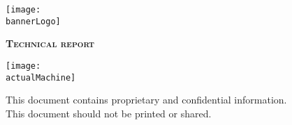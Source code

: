 \begin{titlepage}
    \centering
    \texttt{[image: \\bannerLogo]}\par\vspace{1cm}
    {\scshape\LARGE \textbf{Technical report}}\par\vspace{0.3cm}
    {\Huge \bfseries \textcolor{pinkBanner}{\productToTestName}}\par\vspace{1cm}
    \vfill
    \vfill
    \texttt{[image: \\actualMachine]}\par\vspace{1cm}
    \vfill
    \begin{tcolorbox}[colback=red!5!white,colframe=red!75!black]
        \centering
        This document contains proprietary and confidential information.\\
        This document should not be printed or shared.
    \end{tcolorbox}
    \vfill
    {\large \startDate}\par
    \vfill
    \clearpage
\end{titlepage}